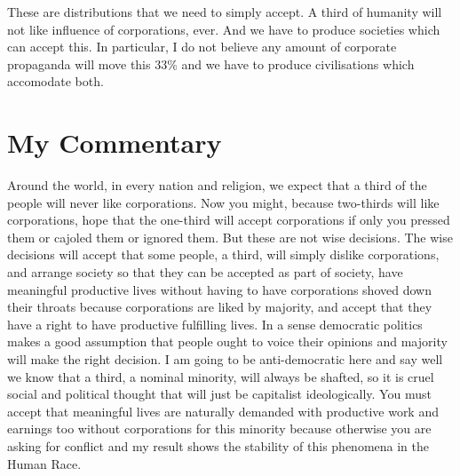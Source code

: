 \documentclass{amsart}
\begin{document}
These are distributions that we need to simply accept.  A third of humanity will not like influence of corporations, ever. And we have to produce societies which can accept this.  In particular, I do not believe any amount of corporate propaganda will move this 33\% and we have to produce civilisations which accomodate both.

\section{My Commentary}

Around the world, in every nation and religion, we expect that a third of the people will never like corporations.  Now you might, because two-thirds will like corporations, hope that the one-third will accept corporations if only you pressed them or cajoled them or ignored them.  But these are not wise decisions.  The wise decisions will accept that some people, a third, will simply dislike corporations, and arrange society so that they can be accepted as part of society, have meaningful productive lives without having to have corporations shoved down their throats because corporations are liked by majority, and accept that they have a right to have productive fulfilling lives.  In a sense democratic politics makes a good assumption that people ought to voice their opinions and majority will make the right decision.  I am going to be anti-democratic here and say well we know that a third, a nominal minority, will always be shafted, so it is cruel social and political thought that will just be capitalist ideologically.  You must accept that meaningful lives are naturally demanded with productive work and earnings too without corporations for this minority because otherwise you are asking for conflict and my result shows the stability of this phenomena in the Human Race.  
\end{document}
